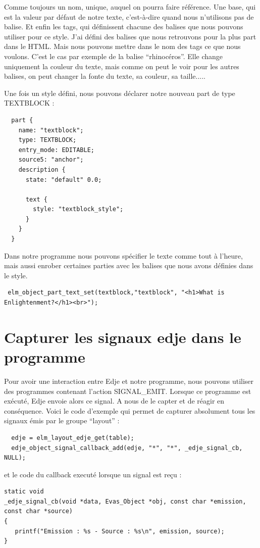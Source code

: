 \documentclass[a4paper]{efr}
\begin{document}
Comme toujours un nom, unique, auquel on pourra faire référence.
Une base, qui est la valeur par défaut de notre texte, c'est-à-dire
quand nous n'utilisons pas de balise. Et enfin les tags, qui définissent
chacune des balises que nous pouvons utiliser pour ce style.
J'ai défini des balises que nous retrouvons pour la plus part dans le HTML.
Mais nous pouvons mettre dans le nom des tags ce que nous voulons.
C'est le cas par exemple de la balise ``rhinocéros''. Elle change uniquement
la couleur du texte, mais comme on peut le voir pour les autres balises, on peut
changer la fonte du texte, sa couleur, sa taille.....

Une fois un style défini, nous pouvons déclarer notre nouveau part de type
TEXTBLOCK :

\begin{lstlisting}
  part {
    name: "textblock";
    type: TEXTBLOCK;
    entry_mode: EDITABLE;
    source5: "anchor";
    description {
      state: "default" 0.0;

      text {
        style: "textblock_style";
      }
    }
  }
\end{lstlisting}

Dans notre programme nous pouvons spécifier le texte comme tout à l'heure, mais
aussi enrober certaines parties avec les balises que nous avons définies dans le style.

\begin{lstlisting}
 elm_object_part_text_set(textblock,"textblock", "<h1>What is Enlightenment?</h1><br>");
\end{lstlisting}

\section{Capturer les signaux edje dans le programme}

Pour avoir une interaction entre Edje et notre programme, nous pouvons utiliser
des programmes contenant l'action SIGNAL\_EMIT. Lorsque ce programme est
exécuté, Edje envoie alors ce signal. A nous de le capter et de réagir en
conséquence.
Voici le code d'exemple qui permet de capturer absolument tous les signaux émis
par le groupe ``layout'' :
\begin{lstlisting}
  edje = elm_layout_edje_get(table);
  edje_object_signal_callback_add(edje, "*", "*", _edje_signal_cb, NULL);
\end{lstlisting}

et le code du callback executé lorsque un signal est reçu :
\begin{lstlisting}
static void
_edje_signal_cb(void *data, Evas_Object *obj, const char *emission, const char *source)
{
   printf("Emission : %s - Source : %s\n", emission, source);
}
\end{lstlisting}
\end{document}

